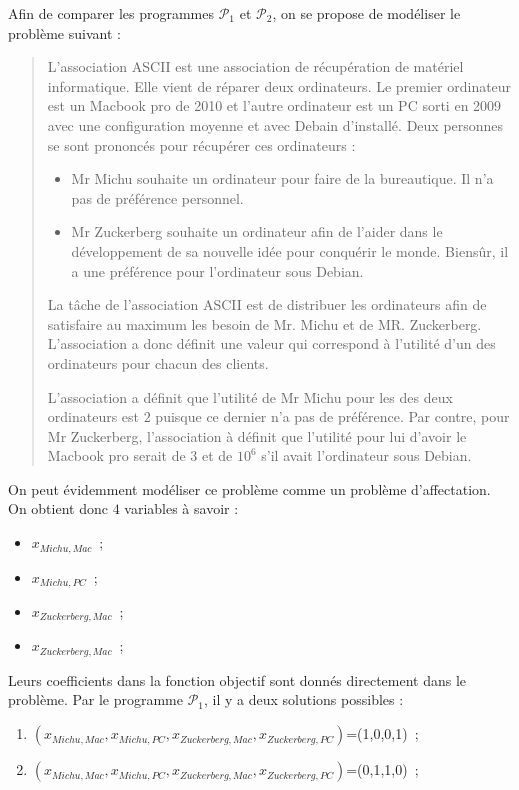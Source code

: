 \documentclass[a4paper, titlepage, oneside, 12pt]{article}%
\begin{document}
Afin de comparer les programmes $\mathcal{P}_1$ et $\mathcal{P}_2$, on se propose de modéliser le problème suivant :
\begin{quote}
L'association ASCII est une association de récupération de matériel informatique. Elle vient de réparer deux ordinateurs. Le premier ordinateur est un Macbook pro de 2010 et l'autre ordinateur est un PC sorti en 2009 avec une configuration moyenne et avec Debain d'installé. Deux personnes se sont prononcés pour récupérer ces ordinateurs :
\begin{itemize}
\item Mr Michu souhaite un ordinateur pour faire de la bureautique. Il n'a pas de préférence personnel.
\item Mr Zuckerberg souhaite un ordinateur afin de l'aider dans le développement de sa nouvelle idée pour conquérir le monde. Biensûr, il a une préférence pour l'ordinateur sous Debian.
\end{itemize}

La tâche de l'association ASCII est de distribuer les ordinateurs afin de satisfaire au maximum les besoin de Mr. Michu et de MR. Zuckerberg. L'association a donc définit une valeur qui correspond à l'utilité d'un des ordinateurs pour chacun des clients.

L'association a définit que l'utilité de Mr Michu pour les des deux ordinateurs est $2$ puisque ce dernier n'a pas de préférence.
Par contre, pour Mr Zuckerberg, l'association à définit que l'utilité pour lui d'avoir le Macbook pro serait de $3$ et de $10^6$ s'il avait l'ordinateur sous Debian. 
\end{quote}

On peut évidemment modéliser ce problème comme un problème d'affectation. On obtient donc $4$ variables à savoir :
\begin{itemize}
\item $x_{Michu, Mac}$~;
\item $x_{Michu, PC}$~;
\item $x_{Zuckerberg, Mac}$~;
\item $x_{Zuckerberg, Mac}$~;
\end{itemize}

Leurs coefficients dans la fonction objectif sont donnés directement dans le problème. Par le programme $\mathcal{P}_1$, il y a deux solutions possibles : 
\begin{enumerate}
\item $(x_{Michu, Mac},x_{Michu, PC},x_{Zuckerberg, Mac},x_{Zuckerberg, PC})$=(1,0,0,1)~;
\item $(x_{Michu, Mac},x_{Michu, PC},x_{Zuckerberg, Mac},x_{Zuckerberg, PC})$=(0,1,1,0)~;
\end{enumerate}
\end{document}
